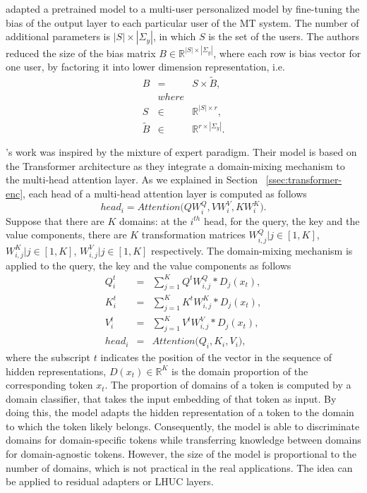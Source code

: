 \citet{Michel18extreme} adapted a pretrained model to a multi-user personalized model by fine-tuning the bias of the output layer to each particular user of the MT system. The number of additional parameters is $|S| \times |\Sigma_y|$, in which $S$ is the set of the users. The authors reduced the size of the bias matrix $B \in \mathbb{R}^{|S| \times |\Sigma_y|}$, where each row is bias vector for one user, by factoring it into lower dimension representation, i.e.
\begin{equation}
\begin{array}{rcl}
B &=& S \times \tilde{B}, \\
&where& \\
S & \in & \mathbb{R}^{|S| \times r}, \\
\tilde{B} & \in & \mathbb{R}^{r \times |\Sigma_y|}.
\end{array}
\end{equation}

\citet{Jiang20Multi}'s work was inspired by the mixture of expert paradigm. Their model is based on the Transformer architecture \citep{Vaswani17attention} as they integrate a domain-mixing mechanism to the multi-head attention layer. As we explained in Section ~\ref{ssec:transformer-enc}, each head of a multi-head attention layer is computed as follows
\begin{equation}
head_i = Attention \big(QW_i^Q, VW_i^V, KW_i^K \big).
\end{equation}
Suppose that there are $K$ domains: at the $i^{th}$ head, for the query, the key and the value components, there are $K$ transformation matrices $W_{i,j}^Q | j \in [1,K]$, $W_{i,j}^K | j \in [1,K]$, $W_{i,j}^V | j \in [1,K]$ respectively. The domain-mixing mechanism is applied to the query, the key and the value components as follows
\begin{equation}
\begin{array}{rcl}
Q_i^t &=& \sum_{j=1}^K Q^tW_{i,j}^Q*\mathit{D}_j(x_t),\\
K_i^t &=& \sum_{j=1}^K K^tW_{i,j}^K*\mathit{D}_j(x_t),\\
V_i^t &=& \sum_{j=1}^K V^tW_{i,j}^V*\mathit{D}_j(x_t),\\
head_i &=& Attention \big( Q_i, K_i, V_i\big),
\end{array}
\end{equation}
where the subscript $t$ indicates the position of the vector in the sequence of hidden representations, $\mathit{D}(x_t) \in \mathbb{R}^{K}$ is the domain proportion of the corresponding token $x_t$. The proportion of domains of a token is computed by a domain classifier, that takes the input embedding of that token as input. By doing this, the model adapts the hidden representation of a token to the domain to which the token likely belongs. Consequently, the model is able to discriminate domains for domain-specific tokens while transferring knowledge between domains for domain-agnostic tokens. However, the size of the model is proportional to the number of domains, which is not practical in the real applications. The idea can be applied to residual adapters or LHUC layers.

